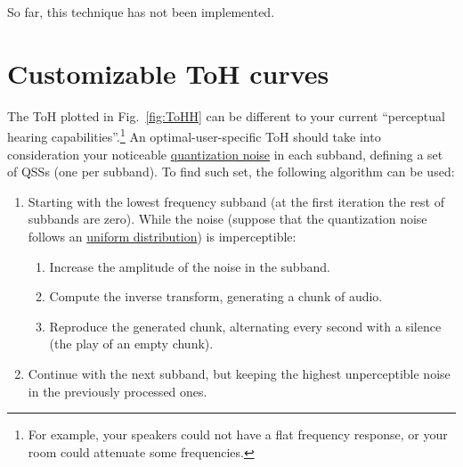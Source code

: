 \begin{comment}
will filter each DWT subband
considering the corresponding part of the ToH curve. To achieve this,
we will use the
\href{https://numpy.org/doc/stable/reference/routines.fft.html}{FFT
  (Fast Fourier Transform)} to map each DWT subband to the Fourier
domain and filter the signal using the ToH curve without generating a
significant increase or decrease in the signal energy. To do this, we
should quantize and dequantize each FFT subband, using the
corresponding QSS.

Finally, notice that (before using the FFT) a temporal window
(different from the square window, which is the one we are using if
we don't apply a
\href{https://en.wikipedia.org/wiki/Window_function}{windowing
  technique}) should be used to minimize the
\href{https://en.wikipedia.org/wiki/Spectral_leakage}{spectral
  leakage}.
\end{comment}

So far, this technique has not been implemented.

\section{Customizable ToH curves}
\label{sec:better_ToH}

The ToH plotted in Fig.~\ref{fig:ToHH} can be different to your
current ``perceptual hearing capabilities''.\footnote{For example,
  your speakers could not have a flat frequency response, or your room
  could attenuate some frequencies.} An optimal-user-specific ToH
should take into consideration your noticeable
\href{https://en.wikipedia.org/wiki/Quantization_(signal_processing)}{quantization
  noise} in each subband, defining a set of QSSs (one per subband). To
find such set, the following algorithm can be used:

\begin{enumerate}
\item %
  Starting with the lowest frequency subband (at the first
  iteration the rest of subbands are zero). While the noise
  (suppose that the quantization noise follows an
  \href{https://en.wikipedia.org/wiki/Continuous_uniform_distribution}{uniform
    distribution}) is imperceptible:
  \begin{enumerate}
  \item Increase the amplitude of the noise in the subband.
  \item Compute the inverse transform, generating a chunk of audio.
  \item Reproduce the generated chunk, alternating every second with
    a silence (the play of an empty chunk).
  \end{enumerate}
\item Continue with the next subband, but keeping the
  highest unperceptible noise in the previously processed
  ones.
\end{enumerate}

